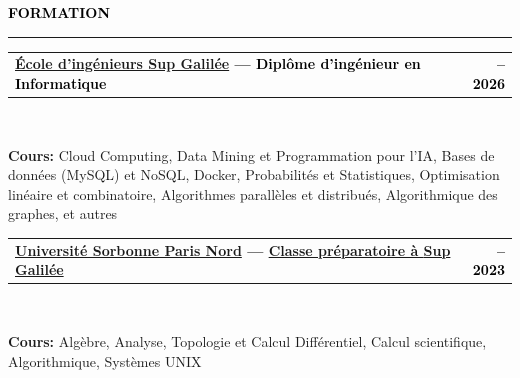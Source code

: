 \documentclass[10pt,english,french]{article}
\makeatletter
\newlength{\mpwidth}
\newcommand{\cvsection}[1]{
    \vspace{4pt}
    \textbf{\fontsize{9pt}{10pt}\selectfont \textcolor{black}{#1}}
    \vspace{6pt}
    \hrule
    \vspace{6pt}
}
\newcommand{\cvtextnotab}[1]{
    \parbox{1\mpwidth}{#1}
}
\newcommand{\cvevent}[2]{
    \vspace{2pt}
    \parbox{\mpwidth}{
        \begin{tabular*}{1\mpwidth}{@{\extracolsep{\fill}} l r}
            \textcolor{black}{\textbf{\fontsize{11}{12}\selectfont #1}} & \textcolor{black}{\textbf{\fontsize{12}{12}\selectfont #2}} \\
        \end{tabular*}\\[-8pt] %
    }
}
\newcommand{\cvsubevent}[2]{
    \parbox{\mpwidth}{
        \begin{tabular*}{1\mpwidth}{@{\extracolsep{\fill}} l r}
            \textcolor{black}{\textit{\fontsize{10}{12}\selectfont #1}} & \textcolor{black}{\textit{\fontsize{10}{12}\selectfont #2}} \\
        \end{tabular*}\\[-8pt] %
    }
    \vspace{-10pt}
}
\makeatother
\begin{document}
\vspace{-5pt}
\cvsection{FORMATION}

\vspace{-3pt}
\cvevent{\href{https://www.sup-galilee.univ-paris13.fr/}{École d'ingénieurs Sup Galilée} --- Diplôme d'ingénieur en Informatique}{\fontsize{11pt}{11pt}\selectfont 2023\hspace{5pt}--\hspace{5pt}2026}

\vspace{-3pt}
\cvtextnotab{\textbf{Cours\!:} Cloud Computing, Data Mining et Programmation pour l'IA, Bases de données (MySQL) et NoSQL, Docker, Probabilités et Statistiques, Optimisation linéaire et combinatoire, Algorithmes parallèles et distribués, Algorithmique des graphes, et autres}

\vspace{-10pt}
\noindent{\textcolor{middle_light_gray}{\rule{\mpwidth}{0.2pt}}}
\vspace{-15pt}

\cvevent{\href{https://www.univ-spn.fr}{Université Sorbonne Paris Nord} --- \href{https://www.sup-galilee.univ-paris13.fr/index.php/formation/cp2i/}{Classe préparatoire à \textbf{Sup Galilée}}}{\fontsize{11pt}{11pt}\selectfont 2021\hspace{5pt}--\hspace{5pt}2023}

\vspace{-10pt}
\cvtextnotab{\textbf{Cours\!:} Algèbre, Analyse, Topologie et Calcul Différentiel, Calcul scientifique, Algorithmique, Systèmes UNIX}

\end{document}
